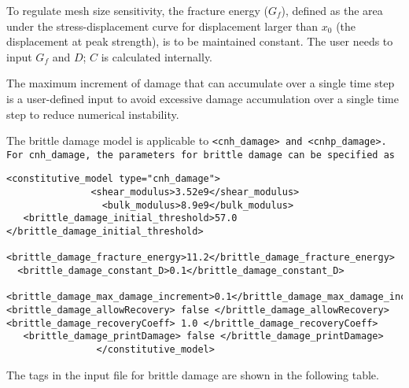 \begin{enumerate}
To regulate mesh size sensitivity, the fracture energy
($G_f$), defined as the area under the stress-displacement
curve for displacement larger than $x_0$ (the displacement at peak strength), is to be maintained constant.
The user needs to input $G_f$ and $D$; $C$ is calculated internally. 

The maximum increment of damage that can accumulate over a single time
step is a user-defined input to avoid excessive damage accumulation over
a single time step to reduce numerical instability.

The brittle damage model is applicable to \tt <cnh\_damage> \normalfont and 
\tt <cnhp\_damage>. \normalfont For \tt cnh\_damage, \normalfont 
the parameters for brittle damage can be specified as

\begin{Verbatim}[fontsize=\footnotesize]
                <constitutive_model type="cnh_damage">
               <shear_modulus>3.52e9</shear_modulus>
                 <bulk_modulus>8.9e9</bulk_modulus>
   <brittle_damage_initial_threshold>57.0 </brittle_damage_initial_threshold>
  <brittle_damage_fracture_energy>11.2</brittle_damage_fracture_energy>
  <brittle_damage_constant_D>0.1</brittle_damage_constant_D>
 <brittle_damage_max_damage_increment>0.1</brittle_damage_max_damage_increment>
<brittle_damage_allowRecovery> false </brittle_damage_allowRecovery>
<brittle_damage_recoveryCoeff> 1.0 </brittle_damage_recoveryCoeff>
   <brittle_damage_printDamage> false </brittle_damage_printDamage>
                </constitutive_model>

\end{Verbatim}

The tags in the input file for brittle damage are shown in the following table.


\end{enumerate}

